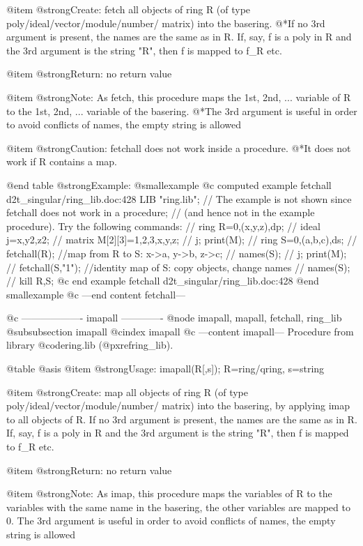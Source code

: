 @item @strong{Create:}
fetch all objects of ring R (of type poly/ideal/vector/module/number/
matrix) into the basering.
@*If no 3rd argument is present, the names are the same as in R. If,
say, f is a poly in R and the 3rd argument is the string "R", then f
is mapped to f_R etc.

@item @strong{Return:}
no return value

@item @strong{Note:}
As fetch, this procedure maps the 1st, 2nd, ... variable of R to the
1st, 2nd, ... variable of the basering.
@*The 3rd argument is useful in order to avoid conflicts of names, the
empty string is allowed

@item @strong{Caution:}
fetchall does not work inside a procedure.
@*It does not work if R contains a map.

@end table
@strong{Example:}
@smallexample
@c computed example fetchall d2t_singular/ring_lib.doc:428 
LIB "ring.lib";
// The example is not shown since fetchall does not work in a procedure;
// (and hence not in the example procedure). Try the following commands:
//   ring R=0,(x,y,z),dp;
//   ideal j=x,y2,z2;
//   matrix M[2][3]=1,2,3,x,y,z;
//   j; print(M);
//   ring S=0,(a,b,c),ds;
//   fetchall(R);       //map from R to S: x->a, y->b, z->c;
//   names(S);
//   j; print(M);
//   fetchall(S,"1");   //identity map of S: copy objects, change names
//   names(S);
//   kill R,S;
@c end example fetchall d2t_singular/ring_lib.doc:428
@end smallexample
@c ---end content fetchall---

@c ------------------- imapall -------------
@node imapall, mapall, fetchall, ring_lib
@subsubsection imapall
@cindex imapall
@c ---content imapall---
Procedure from library @code{ring.lib} (@pxref{ring_lib}).

@table @asis
@item @strong{Usage:}
imapall(R[,s]); R=ring/qring, s=string

@item @strong{Create:}
map all objects of ring R (of type poly/ideal/vector/module/number/
matrix) into the basering, by applying imap to all objects of R.
If no 3rd argument is present, the names are the same as in R. If,
say, f is a poly in R and the 3rd argument is the string "R", then f
is mapped to f_R etc.

@item @strong{Return:}
no return value

@item @strong{Note:}
As imap, this procedure maps the variables of R to the variables with
the same name in the basering, the other variables are mapped to 0.
The 3rd argument is useful in order to avoid conflicts of names, the
empty string is allowed

